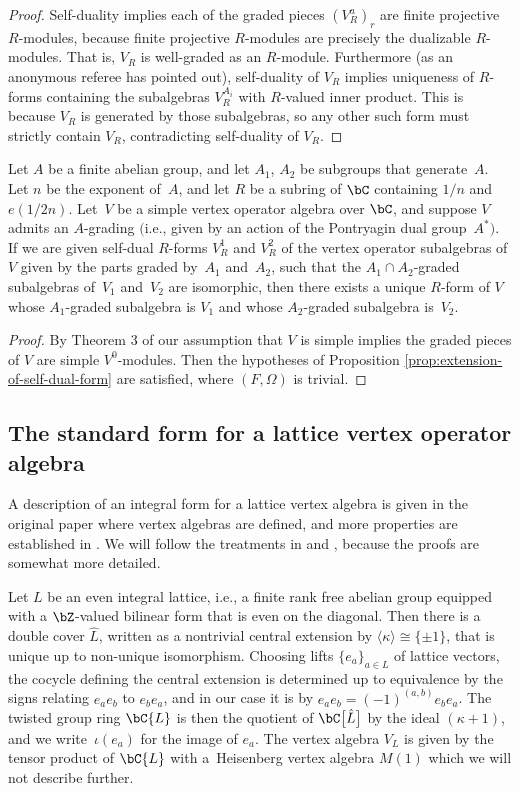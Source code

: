 \begin{proof}
Self-duality implies each of the graded pieces $(V^a_R)_r$ are finite projective $R$-modules, because finite projective $R$-modules are precisely the dualizable $R$-modules. That is, $V_R$ is well-graded as an $R$-module. Furthermore (as an anonymous referee has pointed out), self-duality of $V_R$ implies uniqueness of $R$-forms containing the subalgebras $V^{A_i}_R$ with $R$-valued inner product. This is because $V_R$ is generated by those subalgebras, so any other such form must strictly contain $V_R$, contradicting self-duality of $V_R$.
\end{proof}

\begin{cor} \label{cor:voa-generated-by-subvoas}Let $A$ be a finite abelian group, and let $A_1$, $A_2$ be subgroups that generate~$A$. Let $n$ be the exponent of~$A$, and let $R$ be a subring of $\bC$ containing $1/n$ and $e(1/2n)$. Let~$V$ be a simple vertex operator algebra over $\bC$, and suppose $V$ admits an $A$-grading $($i.e., given by an action of the Pontryagin dual group~$A^*)$. If we are given self-dual $R$-forms $V_R^1$ and $V_R^2$ of the vertex operator subalgebras of $V$ given by the parts graded by~$A_1$ and~$A_2$, such that the $A_1 \cap A_2$-graded subalgebras of~$V_1$ and~$V_2$ are isomorphic, then there exists a unique $R$-form of $V$ whose $A_1$-graded subalgebra is $V_1$ and whose $A_2$-graded subalgebra is~$V_2$.
\end{cor}
\begin{proof}
By Theorem 3 of \cite{DM94a} our assumption that $V$ is simple implies the graded pieces of $V$ are simple $V^0$-modules. Then the hypotheses of Proposition \ref{prop:extension-of-self-dual-form} are satisfied, where $(F,\Omega)$ is trivial.
\end{proof}

\subsection{The standard form for a lattice vertex operator algebra}

A description of an integral form for a lattice vertex algebra is given in the original paper \cite{B86} where vertex algebras are defined, and more properties are established in \cite{B99}. We will follow the treatments in \cite{DG12} and \cite{M14}, because the proofs are somewhat more detailed.

Let $L$ be an even integral lattice, i.e., a finite rank free abelian group equipped with a $\bZ$-valued bilinear form that is even on the diagonal. Then there is a double cover $\hat{L}$, written as a nontrivial central extension by $ \langle \kappa \rangle \cong \{\pm 1\}$, that is unique up to non-unique isomorphism. Choosing lifts $\{ e_a \}_{a\in L}$ of lattice vectors, the cocycle defining the central extension is determined up to equivalence by the signs relating $e_a e_b$ to $e_b e_a$, and in our case it is by $e_a e_b = (-1)^{(a,b)} e_b e_a$. The twisted group ring $\bC\{L\}$ is then the quotient of $\bC\big[\hat{L}\big]$ by the ideal $(\kappa + 1)$, and we write~$\iota(e_a)$ for the image of $e_a$. The vertex algebra $V_L$ is given by the tensor product of $\bC\{L\}$ with a~Heisenberg vertex algebra $M(1)$ which we will not describe further.

